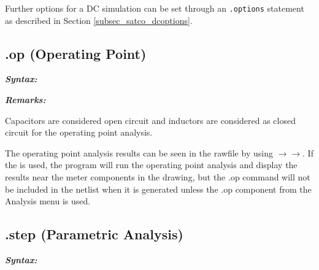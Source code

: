 Further options for a DC simulation can be set through an \texttt{.options} statement as described in Section \ref{subsec_satco_dcoptions}.

\subsection{.op (Operating Point)}
\label{subsec_satco_op}

\textbf{\textit{Syntax:}}


\textbf{\textit{Remarks:}}

Capacitors are considered open circuit and inductors are considered as closed circuit for the operating point analysis.

The operating point analysis results can be seen in the rawfile by using $\to$$\to$.  If the  is used, the program will run the operating point analysis and display the results near the meter components in the drawing, but the \textsf{.op} command will not be included in the netlist when it is generated unless the \textsf{.op} component from the \textsf{Analysis} menu is used.

\subsection{.step (Parametric Analysis)}
\label{subsec_satco_step}



\textbf{\textit{Syntax:}}


